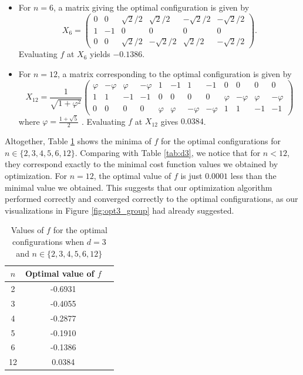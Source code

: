 \documentclass{article}
\begin{document}
\begin{itemize}
    \item For $n=6$, a matrix giving the optimal configuration is given by
          $$
          X_6 = \begin{pmatrix} 0 & 0 & \sqrt{2}/2 & \sqrt{2}/2 & -\sqrt{2}/2 & -\sqrt{2}/2 \\ 1 & -1 & 0 & 0 & 0 & 0 \\ 0 & 0 & \sqrt{2}/2 & -\sqrt{2}/2 & \sqrt{2}/2 & -\sqrt{2}/2 \end{pmatrix}.
          $$
          Evaluating $f$ at $X_6$ yields $-0.1386$.
    \item For $n=12$, a matrix corresponding to the optimal configuration is given by
          $$
          X_{12} = \frac{1}{\sqrt{1+\varphi^2}}
          \begin{pmatrix}
          \varphi & -\varphi & \varphi & -\varphi & 1 & -1 & 1 & -1 & 0 & 0 & 0 & 0 \\ 1 & 1 & -1 & -1 & 0 & 0 & 0 & 0 & \varphi & -\varphi & \varphi & -\varphi \\ 0 & 0 & 0 & 0 & \varphi & \varphi & -\varphi & -\varphi & 1 & 1 & -1 & -1
          \end{pmatrix}
          $$
          where $\varphi = \frac{1+\sqrt{5}}{2}$ \cite{wiki:Icosaèdre}. Evaluating $f$ at $X_{12}$ gives $0.0384$.
\end{itemize}
Altogether, Table \ref{tab:opt} shows the minima of $f$ for the optimal configurations for $n\in\{2, 3, 4, 5, 6, 12\}$. Comparing with Table \ref{tab:d3}, we notice that for $n<12$, they correspond exactly to the minimal cost function values we obtained by optimization. For $n=12$, the optimal value of $f$ is just $0.0001$ less than the minimal value we obtained. This suggests that our optimization algorithm performed correctly and converged correctly to the optimal configurations, as our visualizations in Figure \ref{fig:opt3_group} had already suggested.
\begin{table}[H]
\centering
\begin{tabular}{|c|c|c|}
\hline
$n$ & Optimal value of $f$ \\ \hline
2 & -0.6931 \\
3 & -0.4055 \\
4 & -0.2877 \\
5 & -0.1910 \\
6 & -0.1386 \\
12 & 0.0384 \\
\end{tabular}
\caption{Values of $f$ for the optimal configurations when $d=3$ and $n\in\{2, 3, 4, 5, 6, 12\}$}
\label{tab:opt}
\end{table}
\end{document}
